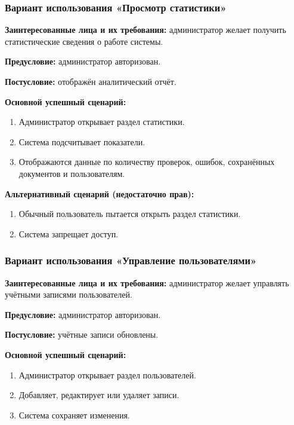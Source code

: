 \subsubsection{Вариант использования «Просмотр статистики»}

\textbf{Заинтересованные лица и их требования:} администратор желает получить статистические сведения о работе системы.

\textbf{Предусловие:} администратор авторизован.

\textbf{Постусловие:} отображён аналитический отчёт.

\textbf{Основной успешный сценарий:}

\begin{enumerate}
	\item Администратор открывает раздел статистики.
	\item Система подсчитывает показатели.
	\item Отображаются данные по количеству проверок, ошибок, сохранённых документов и пользователям.
\end{enumerate}

\textbf{Альтернативный сценарий (недостаточно прав):}

\begin{enumerate}
	\item Обычный пользователь пытается открыть раздел статистики.
	\item Система запрещает доступ.
\end{enumerate}

\subsubsection{Вариант использования «Управление пользователями»}

\textbf{Заинтересованные лица и их требования:} администратор желает управлять учётными записями пользователей.

\textbf{Предусловие:} администратор авторизован.

\textbf{Постусловие:} учётные записи обновлены.

\textbf{Основной успешный сценарий:}

\begin{enumerate}
	\item Администратор открывает раздел пользователей.
	\item Добавляет, редактирует или удаляет записи.
	\item Система сохраняет изменения.
\end{enumerate}

